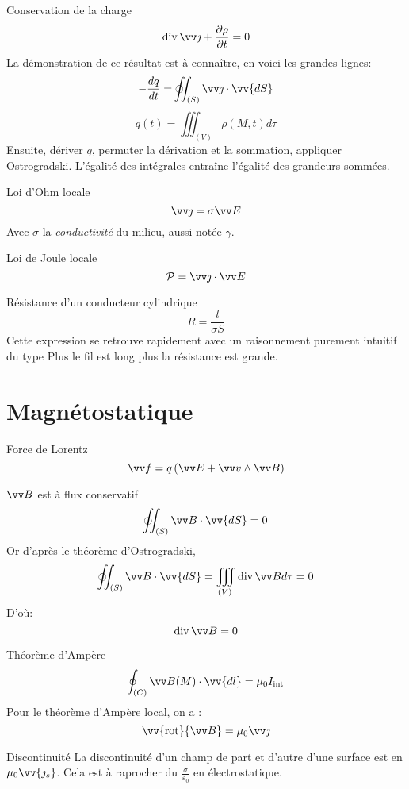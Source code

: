 \documentclass[french, a4paper, 11pt, twocolumn]{article}
\newcommand{\po}{\left(}         %
\newcommand{\pf}{\right)}        %
\newcommand{\pof}[1]{\po #1 \pf} %
\DeclareMathOperator{\diverg}{div}        %
\newcommand{\rota}{\vv{\mathrm{rot}}}    %
\newcommand{\ooint}{\ocircle\hspace{-3.65mm}\int\hspace{-2mm}\int}
\begin{document}
\begin{cadre}{Conservation de la charge}
  \[\diverg \vv\jmath + \dfrac{\partial\rho}{\partial t} = 0\]
  La démonstration de ce résultat est à connaître, en voici les grandes lignes:
  \[-\dfrac{dq}{dt} = \ooint_{(S)}\vv \jmath \cdot\vv{dS}\]
  \[q(t) = \iiint_{(V)} \rho(M, t)d\tau\]
  Ensuite, dériver $q$, permuter la dérivation et la sommation, appliquer Ostrogradski. L'égalité des intégrales entraîne l'égalité des grandeurs sommées.
\end{cadre}

\begin{cadre}{Loi d'Ohm locale}
  \[\vv \jmath = \sigma\vv E\]
  Avec $\sigma$ la \emph{conductivité} du milieu, aussi notée $\gamma$.
\end{cadre}

\begin{cadre}{Loi de Joule locale}
  \[\mathcal P = \vv\jmath\cdot\vv E\]
\end{cadre}

\begin{cadre}{Résistance d'un conducteur cylindrique}
  \[R = \dfrac{l}{\sigma S}\]
  Cette expression se retrouve rapidement avec un raisonnement purement intuitif du type \og Plus le fil est long plus la résistance est grande\fg{}.
\end{cadre}

\section{Magnétostatique}
\begin{cadre}{Force de Lorentz}
  \[ \vv f = q\pof{\vv E + \vv v \wedge \vv B}\]
\end{cadre}

\begin{cadre}{$\vv B$ est à flux conservatif}
  \[\ooint_{(S)}\vv B \cdot\vv{dS} = 0\]
  Or d'après le théorème d'Ostrogradski,
  \[\ooint_{(S)}\vv B \cdot\vv{dS} = \iiint_{(V)}\diverg \vv B d\tau = 0\]
  D'où:
  \[\diverg \vv B = 0\]
\end{cadre}

\begin{cadre}{Théorème d'Ampère}
  \[\oint_{(C)} \vv B(M)\cdot \vv{dl} = \mu_{0}I_{\text{int}}\]
  Pour le théorème d'Ampère local, on a :
  \[\rota{\vv B}=\mu_{0} \vv \jmath\]
\end{cadre}

\begin{cadre}{Discontinuité}
  La discontinuité d'un champ de part et d'autre d'une surface est en $\mu_{0}\vv{\jmath_{s}}$. Cela est à raprocher du $\frac{\sigma}{\varepsilon_{0}}$ en électrostatique.
\end{cadre}
\end{document}

